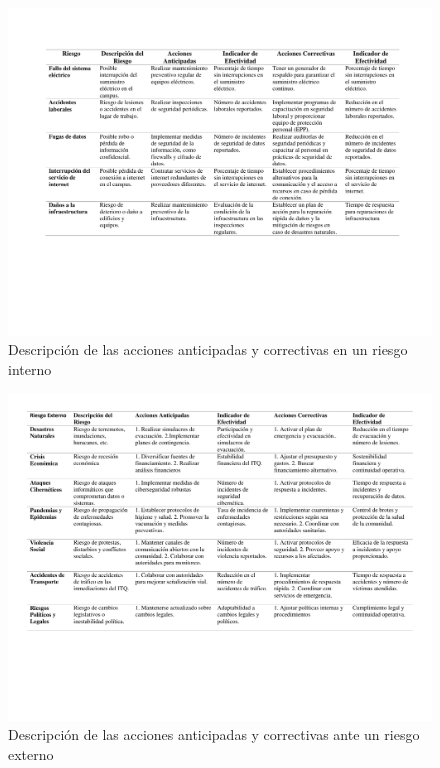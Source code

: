     \begin{figure}[H]
        \centering
        \includegraphics[trim = {20mm 50mm 20mm 26mm},clip,scale=0.30]{1/img/planint.pdf}
        \caption{Descripción de las acciones anticipadas y correctivas en un riesgo interno }
        \label{fig:planaccionInterno}
    \end{figure}
    \begin{figure}[H]
        \centering
        \includegraphics[trim = {15mm 50mm 15mm 20mm},clip,scale=0.30]{1/img/planext.pdf}
        \caption{Descripción de las acciones anticipadas y correctivas ante un riesgo externo}
        \label{fig:planaccionExterno}
    \end{figure}
